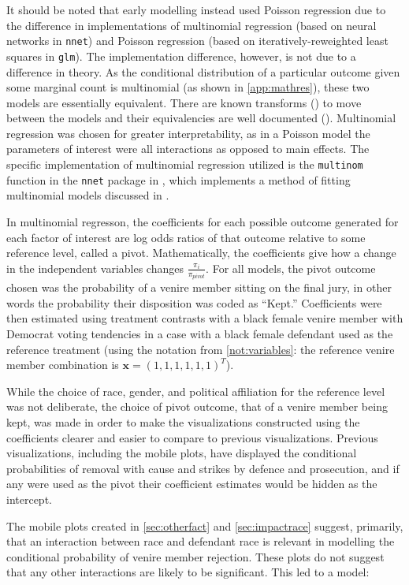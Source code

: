 It should be noted that early modelling instead used Poisson regression due to the difference in implementations of multinomial
regression (based on neural networks in \texttt{nnet}) and Poisson regression (based on iteratively-reweighted least squares in
\texttt{glm}). The implementation difference, however, is not due to a difference in theory. As the conditional distribution of a
particular outcome given some marginal count is multinomial (as shown in \ref{app:mathres}), these two models are essentially
equivalent. There are known transforms (\cite{baker1994}) to move between the models and their equivalencies are well documented
(\cite{lang1996}). Multinomial regression was chosen for greater interpretability, as in a Poisson model the parameters of
interest were all interactions as opposed to main effects. The specific implementation of multinomial regression utilized is the
\texttt{multinom} function in the \texttt{nnet} package in \Rp, which implements a method of fitting multinomial models discussed
in \cite{nnet}.

In multinomial regresson, the coefficients for each possible outcome generated for each factor of interest are log odds ratios of
that outcome relative to some reference level, called a pivot. Mathematically, the coefficients give how a change in the
independent variables changes $\frac{\pi_i}{\pi_{pivot}}$. For all models, the pivot outcome chosen was the probability of a
venire member sitting on the final jury, in other words the probability their disposition was coded as ``Kept.'' Coefficients were
then estimated using treatment contrasts with a black female venire member with Democrat voting tendencies in a case with a black female
defendant used as the reference treatment (using the notation from \ref{not:variables}: the reference venire member combination is
$\mathbf{x} = (1,1,1,1,1,1)^T$).

While the choice of race, gender, and political affiliation for the reference level was not deliberate, the choice of pivot
outcome, that of a venire member being kept, was made in order to make the visualizations constructed using the coefficients
clearer and easier to compare to previous visualizations. Previous visualizations, including the mobile plots, have displayed the
conditional probabilities of removal with cause and strikes by defence and prosecution, and if any were used as the pivot their
coefficient estimates would be hidden as the intercept.

The mobile plots created in \ref{sec:otherfact} and \ref{sec:impactrace} suggest, primarily, that an interaction between race and
defendant race is relevant in modelling the conditional probability of venire member rejection. These plots do not suggest that
any other interactions are likely to be significant. This led to a model:

